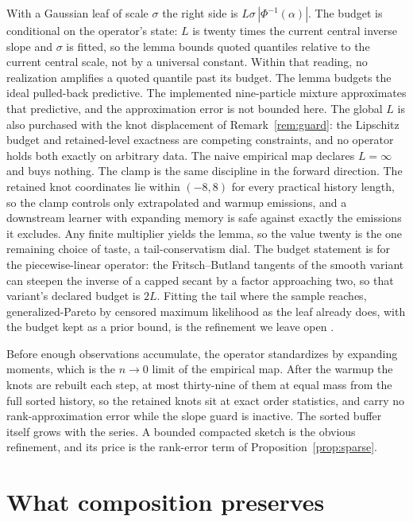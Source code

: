 \documentclass[11pt]{article}
\theoremstyle{remark}
\begin{document}
With a Gaussian leaf of scale $\sigma$ the right side is
$L\sigma\,|\Phi^{-1}(\alpha)|$. The budget is conditional on the operator's state:
$L$ is twenty times the current central inverse slope and $\sigma$ is fitted, so the
lemma bounds quoted quantiles relative to the current central scale, not by a
universal constant. Within that reading, no realization amplifies a quoted quantile
past its budget. The lemma budgets the ideal pulled-back predictive. The
implemented nine-particle mixture approximates that predictive, and the
approximation error is not bounded here. The global $L$ is also purchased with the knot displacement of
Remark~\ref{rem:guard}: the Lipschitz budget and retained-level exactness are
competing constraints, and no operator holds both exactly on arbitrary data. The naive empirical map declares $L = \infty$ and buys nothing. The clamp is
the same discipline in the forward direction. The retained knot coordinates lie
within $(-8, 8)$ for every practical history length, so the clamp controls only
extrapolated and warmup emissions, and a downstream learner with expanding memory is
safe against exactly the emissions it excludes. Any finite multiplier yields the
lemma, so the value twenty is the one remaining choice of taste, a tail-conservatism
dial. The budget statement is for the piecewise-linear operator: the
Fritsch--Butland tangents of the smooth variant can steepen the inverse of a capped
secant by a factor approaching two, so that variant's declared budget is $2L$. Fitting the tail where the sample reaches, generalized-Pareto by censored maximum
likelihood as the leaf already does, with the budget kept as a prior bound, is the
refinement we leave open \citep[the tail instability of the normal quantile
transform is documented by][]{bogner2012normal}.

Before enough observations accumulate, the operator standardizes by expanding moments,
which is the $n \to 0$ limit of the empirical map. After the warmup the knots are rebuilt each step, at most
thirty-nine of them at equal mass from the full sorted history, so the retained knots
sit at exact order statistics, and carry no rank-approximation error while the slope
guard is inactive. The sorted buffer
itself grows with the series. A bounded compacted sketch is the obvious refinement, and
its price is the rank-error term of Proposition~\ref{prop:sparse}.

\section{What composition preserves}\label{sec:typing}
\end{document}
